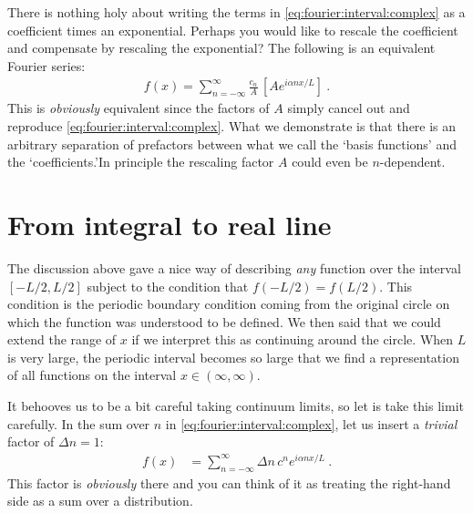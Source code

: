\documentclass[12pt, oneside]{report}    %
\let\oldsection\section
\def\section{%
  \setcounter{sidenote}{1}%
  \oldsection
}
\begin{document}
\begin{example}\label{ex:Fourier:prefactor:convention}
There is nothing holy about writing the terms in \eqref{eq:fourier:interval:complex} as a coefficient times an exponential. Perhaps you would like to rescale the coefficient and compensate by rescaling the exponential? The following is an equivalent Fourier series:
\begin{align}
    f(x) = \sum_{n=-\infty}^\infty 
    \frac{c_n}{A} \, \left[A e^{i\alpha n x/L} \right] \ .
\end{align}
This is \emph{obviously} equivalent since the factors of $A$ simply cancel out and reproduce \eqref{eq:fourier:interval:complex}. What we demonstrate is that there is an arbitrary separation of prefactors between what we call the `basis functions' and the `coefficients.'\sidenotemark  In principle the rescaling factor $A$ could even be $n$-dependent. 
\end{example}


\section{From integral to real line}
The discussion above gave a nice way of describing \emph{any} function over the interval $[-L/2, L/2]$ subject to the condition that $f(-L/2) = f(L/2)$. This condition is the periodic boundary condition coming from the original circle on which the function was understood to be defined. We then said that we could extend the range of $x$ if we interpret this as continuing around the circle. When $L$ is very large, the periodic interval becomes so large that we find a representation of all functions on the interval $x\in (\infty, \infty)$. 

It behooves us to be a bit careful taking continuum limits, so let is take this limit carefully. In the sum over $n$ in \eqref{eq:fourier:interval:complex}, let us insert a \emph{trivial} factor of $\Delta n = 1$:
\begin{align}
    f(x) &= \sum_{n=-\infty}^\infty \Delta n\, c^n e^{i\alpha n x/L} \ .
    \label{eq:toward:fourier:transform:discrete:sum}
\end{align}
This factor is \emph{obviously} there and you can think of it as treating the right-hand side as a sum over a distribution. 
\end{document}
